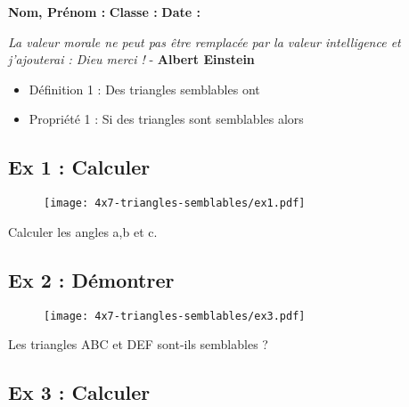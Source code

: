 



\textbf{Nom, Prénom :} \hspace{8cm} \textbf{Classe :} \hspace{3cm} \textbf{Date :}\\

\begin{center}
  \textit{La valeur morale ne peut pas être remplacée par la valeur intelligence et j'ajouterai : Dieu merci !}  - \textbf{Albert Einstein}
\end{center}

\begin{itemize}[label={$\bullet$}]
  \item Définition 1 : Des triangles semblables ont \dotfill
  \item Propriété 1 : Si des triangles sont semblables alors \dotfill
\end{itemize}

\subsection*{Ex 1 : Calculer}

\begin{multicols}{2}
\begin{figure}[H]
  \centering
  \texttt{[image: 4x7-triangles-semblables/ex1.pdf]}
\end{figure}

Calculer les angles a,b et c. \columnbreak

\Pointilles[8]
\end{multicols}

\subsection*{Ex 2 : Démontrer}

\begin{multicols}{2}
\begin{figure}[H]
  \centering
  \texttt{[image: 4x7-triangles-semblables/ex3.pdf]}
\end{figure}

Les triangles ABC et DEF sont-ils semblables ?

\columnbreak

\Pointilles[8]
\end{multicols}

\subsection*{Ex 3 : Calculer}

